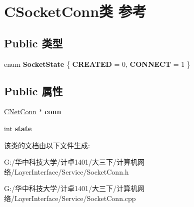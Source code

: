 \hypertarget{class_c_socket_conn}{}\section{C\+Socket\+Conn类 参考}
\label{class_c_socket_conn}
\subsection*{Public 类型}
\begin{DoxyCompactItemize}
\item 
\mbox{\label{class_c_socket_conn_aff511342b5990495abcfb3319889a10f}} 
enum {\bfseries Socket\+State} \{ {\bfseries C\+R\+E\+A\+T\+ED} = 0, 
{\bfseries C\+O\+N\+N\+E\+CT} = 1
 \}
\end{DoxyCompactItemize}
\subsection*{Public 属性}
\begin{DoxyCompactItemize}
\item 
\mbox{\label{class_c_socket_conn_a07e98f72e33f3bf788545c1446c5aaeb}} 
\hyperlink{class_c_net_conn}{C\+Net\+Conn} $\ast$ {\bfseries conn}
\item 
\mbox{\label{class_c_socket_conn_a3071170de60991704e2f9a958bfa0b13}} 
int {\bfseries state}
\end{DoxyCompactItemize}


该类的文档由以下文件生成\+:\begin{DoxyCompactItemize}
\item 
G\+:/华中科技大学/计卓1401/大三下/计算机网络/\+Layer\+Interface/\+Service/Socket\+Conn.\+h\item 
G\+:/华中科技大学/计卓1401/大三下/计算机网络/\+Layer\+Interface/\+Service/Socket\+Conn.\+cpp\end{DoxyCompactItemize}
